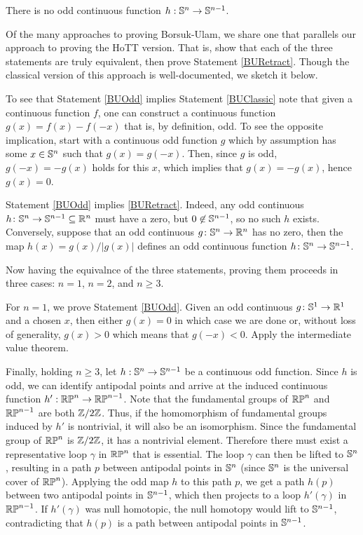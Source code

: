 \documentclass{amsart}
\begin{document}
\begin{statement}\label{BURetract}
  There is no odd continuous function $h:\mathbb{S}^n \rightarrow \mathbb{S}^{n-1}$.
\end{statement}

Of the many approaches to proving Borsuk-Ulam, we share one that
parallels our approach to proving the HoTT version.  That is, show
that each of the three statements are truly equivalent, then prove
Statement \ref{BURetract}. Though the classical version of this
approach is well-documented, we sketch it below.

To see that Statement \ref{BUOdd} implies Statement
\ref{BUClassic} note that given a continuous function $f$, one can
construct a continuous function $g(x) = f(x) - f(-x)$ that is, by
definition, odd. To see the opposite implication, start with a
continuous odd function $g$ which by assumption has some $x \in \mathbb{S}^n$
such that $g(x)=g(-x)$. Then, since $g$ is odd, $g(-x) = -g(x)$ holds
for this $x$, which implies that $g(x)= -g(x)$, hence $g(x)=0$.

Statement \ref{BUOdd} implies \ref{BURetract}. Indeed, any odd
continuous $h \colon \mathbb{S}^n \to \mathbb{S}^{n-1} \subseteq \mathbb{R}^n$ must have a
zero, but $0 \not\in \mathbb{S}^{n-1}$, so no such $h$ exists.  Conversely,
suppose that an odd continuous $g \colon \mathbb{S}^n \to \mathbb{R}^n$ has no zero,
then the map $h(x) = g(x) / \vert g(x) \vert$ defines an odd
continuous function $h \colon \mathbb{S}^n \to \mathbb{S}^{n-1}$. 

Now having the equivalnce of the three statements, proving them
proceeds in three cases: $n=1$, $n=2$, and $n \geq 3$.

For $n=1$, we prove Statement \ref{BUOdd}. Given an odd continuous
$g \colon \mathbb{S}^1 \to \mathbb{R}^1$ and a chosen $x$, then either $g(x)=0$ in
which case we are done or, without loss of generality, $g(x) > 0$
which means that $g(-x) < 0$.  Apply the intermediate value theorem.


Finally, holding $n \geq 3$, let $h:\mathbb{S}^n \rightarrow \mathbb{S}^{n-1}$ be a
continuous odd function. Since $h$ is odd, we can identify antipodal
points and arrive at the induced continuous function
$h':\mathbb{RP}^n\rightarrow\mathbb{RP}^{n-1}$. Note that the fundamental groups of
$\mathbb{RP}^n$ and $\mathbb{RP}^{n-1}$ are both $\mathbb{Z}/2\mathbb{Z}$.  Thus, if the
homomorphism of fundamental groups induced by $h'$ is nontrivial, it
will also be an isomorphism.  Since the fundamental group of $\mathbb{RP}^n$
is $\mathbb{Z}/2\mathbb{Z}$, it has a nontrivial element. Therefore there must exist a
representative loop $\gamma$ in $\mathbb{RP}^n$ that is essential. The loop
$\gamma$ can then be lifted to $\mathbb{S}^n$, resulting in a path $p$
between antipodal points in $\mathbb{S}^n$ (since $\mathbb{S}^n$ is the universal
cover of $\mathbb{RP}^n$). Applying the odd map $h$ to this path $p$, we get
a path $h(p)$ between two antipodal points in $\mathbb{S}^{n-1}$, which then
projects to a loop $h'(\gamma)$ in $\mathbb{RP}^{n-1}$. If $h'(\gamma)$ was
null homotopic, the null homotopy would lift to $\mathbb{S}^{n-1}$,
contradicting that $h(p)$ is a path between antipodal points in
$\mathbb{S}^{n-1}$.
 
\end{document}
